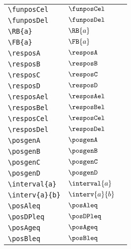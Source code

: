 \begin{longtable}{lll}
 {\color[rgb]{0.5,0.5,0.5}\texttt{\textbackslash funposCel}} & $\funposCel$ & \\ 
 {\color[rgb]{0.5,0.5,0.5}\texttt{\textbackslash funposDel}} & $\funposDel$ & \\ 
 {\color[rgb]{0.5,0.5,0.5}\texttt{\textbackslash RB\{a\}}} & $\RB{a}$ & \\ 
 {\color[rgb]{0.5,0.5,0.5}\texttt{\textbackslash FB\{a\}}} & $\FB{a}$ & \\ 
 {\color[rgb]{0.5,0.5,0.5}\texttt{\textbackslash resposA}} & $\resposA$ & \\ 
 {\color[rgb]{0.5,0.5,0.5}\texttt{\textbackslash resposB}} & $\resposB$ & \\ 
 {\color[rgb]{0.5,0.5,0.5}\texttt{\textbackslash resposC}} & $\resposC$ & \\ 
 {\color[rgb]{0.5,0.5,0.5}\texttt{\textbackslash resposD}} & $\resposD$ & \\ 
 {\color[rgb]{0.5,0.5,0.5}\texttt{\textbackslash resposAel}} & $\resposAel$ & \\ 
 {\color[rgb]{0.5,0.5,0.5}\texttt{\textbackslash resposBel}} & $\resposBel$ & \\ 
 {\color[rgb]{0.5,0.5,0.5}\texttt{\textbackslash resposCel}} & $\resposCel$ & \\ 
 {\color[rgb]{0.5,0.5,0.5}\texttt{\textbackslash resposDel}} & $\resposDel$ & \\ 
 {\color[rgb]{0.5,0.5,0.5}\texttt{\textbackslash posgenA}} & $\posgenA$ & \\ 
 {\color[rgb]{0.5,0.5,0.5}\texttt{\textbackslash posgenB}} & $\posgenB$ & \\ 
 {\color[rgb]{0.5,0.5,0.5}\texttt{\textbackslash posgenC}} & $\posgenC$ & \\ 
 {\color[rgb]{0.5,0.5,0.5}\texttt{\textbackslash posgenD}} & $\posgenD$ & \\ 
 {\color[rgb]{0.5,0.5,0.5}\texttt{\textbackslash interval\{a\}}} & $\interval{a}$ & \\ 
 {\color[rgb]{0.5,0.5,0.5}\texttt{\textbackslash interv\{a\}\{b\}}} & $\interv{a}{b}$ & \\ 
 {\color[rgb]{0.5,0.5,0.5}\texttt{\textbackslash posAleq}} & $\posAleq$ & \\ 
 {\color[rgb]{0.5,0.5,0.5}\texttt{\textbackslash posDPleq}} & $\posDPleq$ & \\ 
 {\color[rgb]{0.5,0.5,0.5}\texttt{\textbackslash posAgeq}} & $\posAgeq$ & \\ 
 {\color[rgb]{0.5,0.5,0.5}\texttt{\textbackslash posBleq}} & $\posBleq$ & \\ 

\end{longtable}
